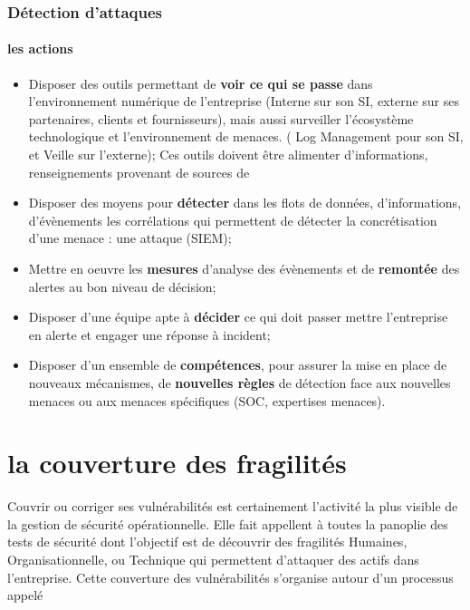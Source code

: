 \begin{frame}
\frametitle<presentation>{Détection d'attaques}
\framesubtitle<presentation>{les actions}
\begin{itemize}
  \item Disposer des outils permettant de \textbf{voir ce qui se passe} dans l'environnement numérique de l'entreprise (Interne sur son SI, externe sur ses partenaires, clients et fournisseurs), mais aussi surveiller l'écosystème technologique et l'environnement de menaces. ( Log Management pour son SI, et Veille sur l'externe); Ces outils doivent être alimenter d'informations, renseignements provenant de sources de 
  \item Disposer des moyens  pour \textbf{détecter} dans les flots de données, d'informations, d'évènements les corrélations qui permettent de détecter la concrétisation d'une menace : une attaque (SIEM);
  \item Mettre en oeuvre les \textbf{mesures} d'analyse des évènements et de \textbf{remontée} des alertes au bon niveau de décision;
  \item Disposer d'une équipe apte à \textbf{décider} ce qui doit passer mettre l'entreprise en alerte et engager une réponse à incident;
  \item Disposer d'un ensemble de \textbf{compétences}, pour assurer la mise en place de nouveaux mécanismes, de \textbf{nouvelles règles }de détection face aux nouvelles menaces ou aux menaces spécifiques (SOC, expertises menaces).
\end{itemize}
\end{frame}

\section{la couverture des fragilités}

Couvrir ou corriger ses vulnérabilités est certainement l'activité la plus visible de la gestion de sécurité opérationnelle. Elle fait appellent à toutes la panoplie des tests de sécurité dont l'objectif est de découvrir des fragilités Humaines, Organisationnelle, ou Technique qui permettent d'attaquer des actifs dans l'entreprise.
Cette couverture des vulnérabilités s'organise autour d'un processus appelé 


